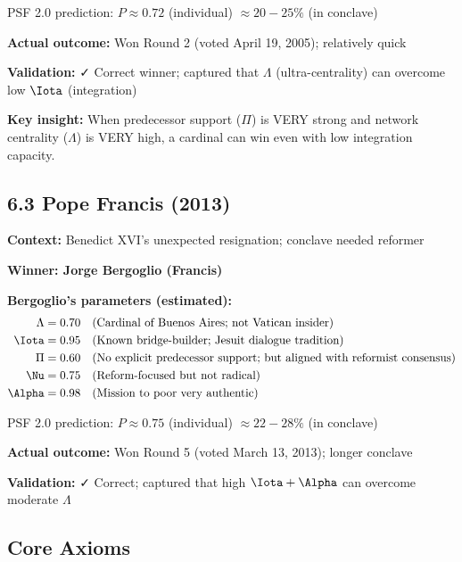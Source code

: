 PSF 2.0 prediction: $P \approx 0.72$ (individual) $\approx 20-25\%$ (in conclave)

\textbf{Actual outcome:} Won Round 2 (voted April 19, 2005); relatively quick

\textbf{Validation:} ✓ Correct winner; captured that $\Lambda$ (ultra-centrality) can overcome low $\Iota$ (integration)

\textbf{Key insight:} When predecessor support ($\Pi$) is VERY strong and network centrality ($\Lambda$) is VERY high, a cardinal can win even with low integration capacity.

\subsection{6.3 Pope Francis (2013)}

\textbf{Context:} Benedict XVI's unexpected resignation; conclave needed reformer

\textbf{Winner: Jorge Bergoglio (Francis)}

\textbf{Bergoglio's parameters (estimated):}
\begin{align*}
\Lambda &= 0.70 \quad \text{(Cardinal of Buenos Aires; not Vatican insider)} \\
\Iota &= 0.95 \quad \text{(Known bridge-builder; Jesuit dialogue tradition)} \\
\Pi &= 0.60 \quad \text{(No explicit predecessor support; but aligned with reformist consensus)} \\
\Nu &= 0.75 \quad \text{(Reform-focused but not radical)} \\
\Alpha &= 0.98 \quad \text{(Mission to poor very authentic)}
\end{align*}

PSF 2.0 prediction: $P \approx 0.75$ (individual) $\approx 22-28\%$ (in conclave)

\textbf{Actual outcome:} Won Round 5 (voted March 13, 2013); longer conclave

\textbf{Validation:} ✓ Correct; captured that high $\Iota + \Alpha$ can overcome moderate $\Lambda$


\subsection{Core Axioms}
\label{sec:pap3-axioms}

